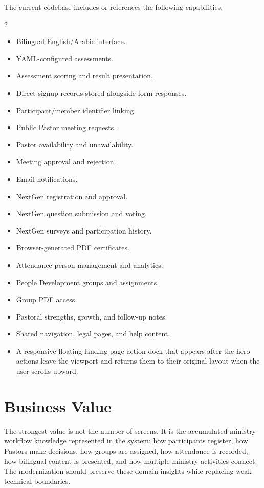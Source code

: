 \documentclass[11pt,a4paper,oneside]{report}
\begin{document}
The current codebase includes or references the following capabilities:

\begin{multicols}{2}
\begin{itemize}
  \item Bilingual English/Arabic interface.
  \item YAML-configured assessments.
  \item Assessment scoring and result presentation.
  \item Direct-signup records stored alongside form responses.
  \item Participant/member identifier linking.
  \item Public Pastor meeting requests.
  \item Pastor availability and unavailability.
  \item Meeting approval and rejection.
  \item Email notifications.
  \item NextGen registration and approval.
  \item NextGen question submission and voting.
  \item NextGen surveys and participation history.
  \item Browser-generated PDF certificates.
  \item Attendance person management and analytics.
  \item People Development groups and assignments.
  \item Group PDF access.
  \item Pastoral strengths, growth, and follow-up notes.
  \item Shared navigation, legal pages, and help content.
  \item A responsive floating landing-page action dock that appears after the hero actions leave the viewport and returns them to their original layout when the user scrolls upward.
\end{itemize}
\end{multicols}

\section{Business Value}

The strongest value is not the number of screens. It is the accumulated ministry workflow knowledge represented in the system: how participants register, how Pastors make decisions, how groups are assigned, how attendance is recorded, how bilingual content is presented, and how multiple ministry activities connect. The modernization should preserve these domain insights while replacing weak technical boundaries.
\end{document}
